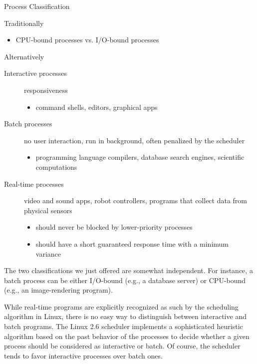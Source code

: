 \begin{frame}{Process Classification}
  \begin{block}{Traditionally}
    \begin{itemize}
    \item[] CPU-bound processes vs. I/O-bound processes
    \end{itemize}
  \end{block}
  \begin{block}{Alternatively}
    \begin{description}%
    \item[Interactive processes] responsiveness
      \begin{itemize}
      \item command shells, editors, graphical apps
      \end{itemize}
    \item[Batch processes] no user interaction, run in background, often penalized by the
      scheduler
      \begin{itemize}
      \item programming language compilers, database search engines, scientific
        computations
      \end{itemize}
    \item[Real-time processes] video and sound apps, robot controllers, programs that
      collect data from physical sensors
      \begin{itemize}
      \item should never be blocked by lower-priority processes
      \item should have a short guaranteed response time with a minimum variance
      \end{itemize}
    \end{description}
  \end{block}
\end{frame}

The two classifications we just offered are somewhat independent. For instance, a batch
process can be either I/O-bound (e.g., a database server) or CPU-bound (e.g., an
image-rendering program).

While real-time programs are explicitly recognized as such by the scheduling algorithm in
Linux, there is no easy way to distinguish between interactive and batch programs. The
Linux 2.6 scheduler implements a sophisticated heuristic algorithm based on the past
behavior of the processes to decide whether a given process should be considered as
interactive or batch. Of course, the scheduler tends to favor interactive processes over
batch ones.

